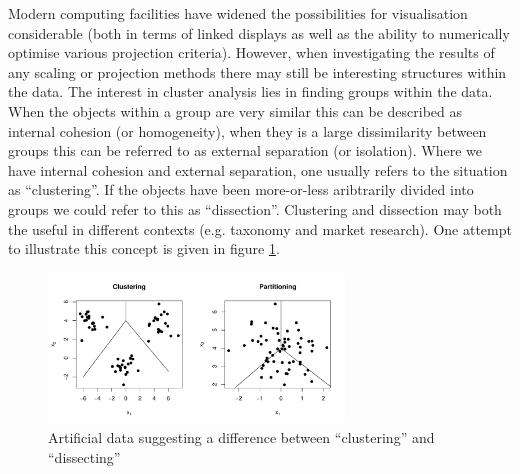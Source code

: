 Modern computing facilities have widened the possibilities for visualisation considerable (both in terms of linked displays as well as the ability to numerically optimise various projection criteria).   However, when investigating the results of any scaling or projection methods there may still be interesting structures within the data.   The interest in cluster analysis lies in finding groups within the data.   When the objects within a group are very similar this can be described as internal cohesion (or homogeneity), when they is a large dissimilarity between groups this can be referred to as external separation (or isolation).   Where we have internal cohesion and external separation, one usually refers to the situation as ``clustering''. If the objects have been more-or-less
aribtrarily divided into groups we could refer to this as ``dissection''.
Clustering and dissection may both the useful in different
contexts (e.g. taxonomy and market research).   One attempt to illustrate this concept is given in figure \ref{partclust}.


 


\begin{figure}
\begin{center}
\includegraphics[width = 0.7\textwidth]{images/partclust}
\caption{Artificial data suggesting a difference between ``clustering'' and ``dissecting''}
\label{partclust}
\end{center}
\end{figure}



